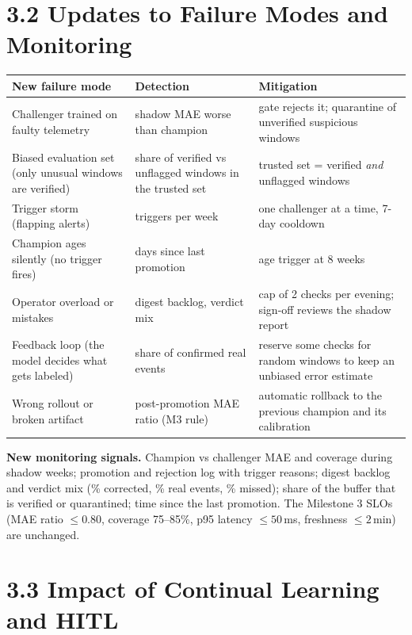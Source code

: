 \documentclass[11pt,letterpaper]{article}
\begin{document}
\section*{3.2 Updates to Failure Modes and Monitoring}

\begin{table}[H]
\centering\small
\begin{tabularx}{\textwidth}{@{}p{3.6cm}YY@{}}
\toprule
New failure mode & Detection & Mitigation \\
\midrule
Challenger trained on faulty telemetry & shadow MAE worse than champion & gate rejects it; quarantine of unverified suspicious windows \\
Biased evaluation set (only unusual windows are verified) & share of verified vs unflagged windows in the trusted set & trusted set = verified \emph{and} unflagged windows \\
Trigger storm (flapping alerts) & triggers per week & one challenger at a time, 7-day cooldown \\
Champion ages silently (no trigger fires) & days since last promotion & age trigger at 8 weeks \\
Operator overload or mistakes & digest backlog, verdict mix & cap of 2 checks per evening; sign-off reviews the shadow report \\
Feedback loop (the model decides what gets labeled) & share of confirmed real events & reserve some checks for random windows to keep an unbiased error estimate \\
Wrong rollout or broken artifact & post-promotion MAE ratio (M3 rule) & automatic rollback to the previous champion and its calibration \\
\bottomrule
\end{tabularx}
\end{table}

\textbf{New monitoring signals.} Champion vs challenger MAE and coverage during shadow weeks; promotion and rejection
log with trigger reasons; digest backlog and verdict mix (\% corrected, \% real events, \% missed); share of the
buffer that is verified or quarantined; time since the last promotion. The Milestone 3 SLOs (MAE ratio $\le 0.80$,
coverage 75--85\%, p95 latency $\le 50$\,ms, freshness $\le 2$\,min) are unchanged.

\section*{3.3 Impact of Continual Learning and HITL}
\end{document}
